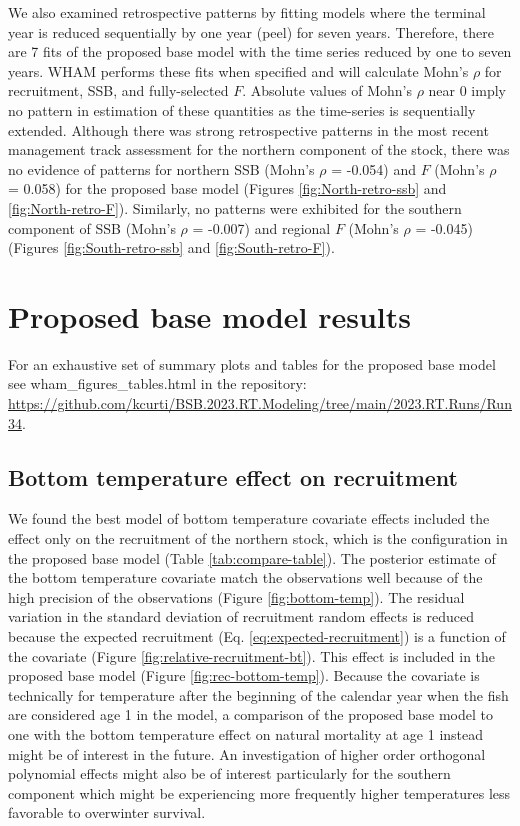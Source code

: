 \documentclass[
]{article}
\begin{document}
We also examined retrospective patterns by fitting models where the terminal year is reduced sequentially by one year (peel) for seven years. Therefore, there are 7 fits of the proposed base model with the time series reduced by one to seven years. WHAM performs these fits when specified and will calculate Mohn's \(\rho\) for recruitment, SSB, and fully-selected \(F\). Absolute values of Mohn's \(\rho\) near 0 imply no pattern in estimation of these quantities as the time-series is sequentially extended. Although there was strong retrospective patterns in the most recent management track assessment for the northern component of the stock, there was no evidence of patterns for northern SSB (Mohn's \(\rho\) = -0.054) and \(F\) (Mohn's \(\rho\) = 0.058) for the proposed base model (Figures \ref{fig:North-retro-ssb} and \ref{fig:North-retro-F}). Similarly, no patterns were exhibited for the southern component of SSB (Mohn's \(\rho\) = -0.007) and regional \(F\) (Mohn's \(\rho\) = -0.045) (Figures \ref{fig:South-retro-ssb} and \ref{fig:South-retro-F}).

\hypertarget{proposed-base-model-results}{%
\section{Proposed base model results}\label{proposed-base-model-results}}

For an exhaustive set of summary plots and tables for the proposed base model see wham\_figures\_tables.html in the repository: \url{https://github.com/kcurti/BSB.2023.RT.Modeling/tree/main/2023.RT.Runs/Run34}.

\hypertarget{bottom-temperature-effect-on-recruitment}{%
\subsection{Bottom temperature effect on recruitment}\label{bottom-temperature-effect-on-recruitment}}

We found the best model of bottom temperature covariate effects included the effect only on the recruitment of the northern stock, which is the configuration in the proposed base model (Table \ref{tab:compare-table}). The posterior estimate of the bottom temperature covariate match the observations well because of the high precision of the observations (Figure \ref{fig:bottom-temp}). The residual variation in the standard deviation of recruitment random effects is reduced because the expected recruitment (Eq. \ref{eq:expected-recruitment}) is a function of the covariate (Figure \ref{fig:relative-recruitment-bt}). This effect is included in the proposed base model (Figure \ref{fig:rec-bottom-temp}). Because the covariate is technically for temperature after the beginning of the calendar year when the fish are considered age 1 in the model, a comparison of the proposed base model to one with the bottom temperature effect on natural mortality at age 1 instead might be of interest in the future. An investigation of higher order orthogonal polynomial effects might also be of interest particularly for the southern component which might be experiencing more frequently higher temperatures less favorable to overwinter survival.
\end{document}
